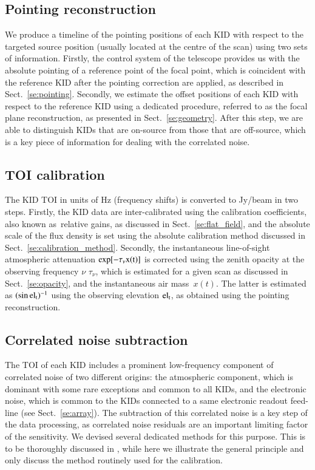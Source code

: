 \documentclass[traditionalabstract]{aa}
\newcommand{\elev}{\rm{el}}
\newcommand{\taunu}{\tau_{\nu}}
\newcommand{\airmass}{air mass}
\newcommand{\lp}[1]{#1}
\begin{document}
{\subsection{Pointing reconstruction}
\label{se:ptg}
We produce a timeline of the pointing positions of each KID with
respect to the targeted source position (usually located at the centre of the
scan) using two sets of information. Firstly, the control system of the
telescope provides us with the absolute pointing of a reference point
of the focal point, which is coincident with the reference KID after
the pointing correction are applied, as described in
Sect.~\ref{se:pointing}. Secondly, we estimate the offset positions of
each KID with respect to the reference KID using a dedicated
procedure, referred to as the focal plane reconstruction, as
presented in Sect.~\ref{se:geometry}. After this step, we are able to
distinguish KIDs that are on-source from those that are off-source,
which is a key piece of information for dealing with the correlated noise. 
  
\subsection{TOI calibration}
\label{se:flux_calib}
The KID TOI in units of Hz (frequency shifts) is converted to
Jy/beam in two steps. Firstly, the KID data are inter-calibrated using the
calibration coefficients, also known as\ relative gains, 
as discussed in Sect.~\ref{se:flat_field}, and the
absolute scale of the flux density is set using the absolute
calibration method discussed in
Sect.~\ref{se:calibration_method}. Secondly, the instantaneous line-of-sight
atmospheric attenuation $\rm{exp}[{-\taunu x(t)}]$ is corrected
using the zenith opacity at the observing frequency $\nu$ $\taunu$, which is estimated for a given scan
as discussed in Sect.~\ref{se:opacity}, and the instantaneous \airmass\
$x(t)$. {\lp The latter is estimated as $(\sin \elev_t)^{-1}$ using the observing elevation
$\elev_t$, as obtained using the pointing reconstruction.}     

\subsection{Correlated noise subtraction}
\label{se:toi_proc}
The TOI of each KID includes a prominent low-frequency component of correlated noise of two
different origins: the atmospheric component, which is dominant
{\lp with some rare exceptions} and common to all KIDs, and the electronic noise, which is common to the KIDs connected
to a same electronic readout feed-line (see
Sect.~\ref{se:array}). The subtraction of this correlated noise is a key
step of the data processing, as correlated noise residuals are an
important limiting factor of the sensitivity. We devised several
dedicated methods for this purpose. This is to be thoroughly
discussed in \citet{Ponthieu2019}, while here we illustrate the
general principle and only discuss the method routinely used for
the calibration.

}
\end{document}
